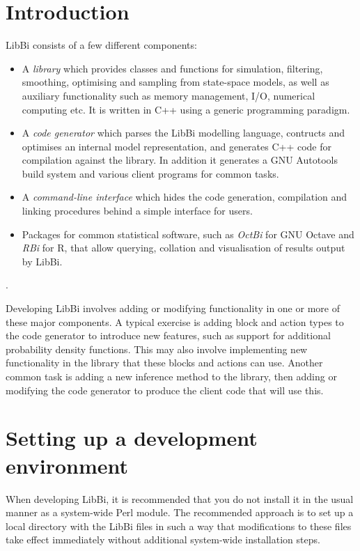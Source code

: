\section{Introduction}

LibBi consists of a few different components:
\begin{itemize}
\item A \emph{library} which provides classes and functions for simulation,
  filtering, smoothing, optimising and sampling from state-space models, as
  well as auxiliary functionality such as memory management, I/O, numerical
  computing etc. It is written in C++ using a generic programming paradigm.
\item A \emph{code generator} which parses the LibBi modelling language,
  contructs and optimises an internal model representation, and generates C++
  code for compilation against the library. In addition it generates a GNU
  Autotools build system and various client programs for common tasks.
\item A \emph{command-line interface} which hides the code generation,
  compilation and linking procedures behind a simple interface for users.
\item Packages for common statistical software, such as \emph{OctBi} for GNU
  Octave and \emph{RBi} for R, that allow querying, collation and
  visualisation of results output by LibBi.
\end{itemize}.

Developing LibBi involves adding or modifying functionality in one or more of
these major components. A typical exercise is adding block
and action types to the code generator to introduce new features, such as
support for additional probability density
functions. This may also involve implementing new
functionality in the library that these blocks and actions can use. Another
common task is adding a new inference method to the library, then adding or
modifying the code generator to produce the client code that will use this.

\section{Setting up a development environment}

When developing LibBi, it is recommended that you do not install it in the
usual manner as a system-wide Perl module. The recommended approach is to set
up a local directory with the LibBi files in such a way that modifications to
these files take effect immediately without additional system-wide
installation steps.

